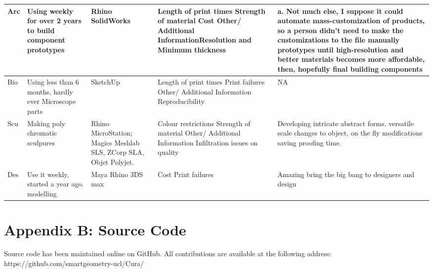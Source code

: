 \documentclass[11pt]{report} %
\begin{document}
\begin{longtable}{| p{1cm} | p{2.5cm} | p{2cm} | p{4cm} | p{4cm} |}
Arc & Using weekly for over 2 years to  build component prototypes & Rhino SolidWorks & Length of print times
Strength of material
Cost
Other/ Additional InformationResolution and Minimum thickness & a. Not much else, I suppose it could automate mass-customization of products, so a person didn't need to make the customizations to the file manually
prototypes until high-resolution and better materials becomes more affordable, then, hopefully final building components \\\hline

Bio  & Using less than 6 months, hardly ever
Microscope parts & SketchUp & Length of print times
Print failures
Other/ Additional Information Reproducibility & NA \\\hline

Scu & Making poly chromatic sculpures & Rhino MicroStation; Magics Meshlab  SLS, ZCorp SLA, Objet Polyjet. & Colour restrictions
Strength of material
Other/ Additional Information Infiltration issues on quality & Developing intricate abstract forms. 
versatile scale changes to object, on the fly modifications saving proofing time. \\\hline

Des & Use it weekly, started a year ago. modelling  & Maya Rhino 3DS max & Cost 
Print failures  & Amazing
bring the big bang to designers and design \\\hline



\end{longtable}



\chapter{Appendix B: Source Code}
Source code has been maintained online on GitHub. All contributions are available at the following address:
https://github.com/smartgeometry-ucl/Cura/

\nocite{*}


\end{document}

